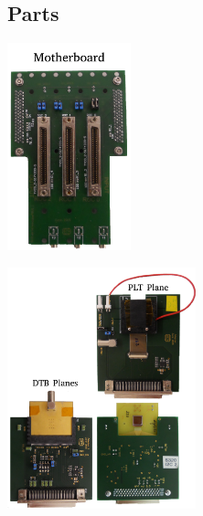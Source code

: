 \documentclass[9pt]{beamer}
\begin{document}
\subsection{Parts}
\begin{frame}
	\begin{center}
		\begin{minipage}{5.5cm}
			\centering
			\includegraphics[height=6cm]{Pics/Motherboard1}
		\end{minipage}
		\hspace*{2pt}
		\begin{minipage}{5.5cm}
			\centering
			\includegraphics[height=7cm]{Pics/Adapters}
		\end{minipage}
	\end{center}
\end{frame}
\end{document}
